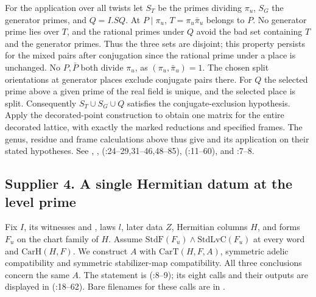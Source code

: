 For the application over all twists let $S_T$ be the primes dividing
$\pi_u$, $S_G$ the generator primes, and $Q=I.SQ$. At $P\mid\pi_u$,
$T=\pi_u\bar\pi_u$ belongs to $P$. No generator prime lies over $T$,
and the rational primes under $Q$ avoid the bad set containing $T$ and
the generator primes. Thus the three sets are disjoint; this property
persists for the mixed pairs after conjugation since the rational prime
under a place is unchanged. No $P,\bar P$ both divide $\pi_u$,
as $(\pi_u,\bar\pi_u)=1$. The chosen split orientations at generator
places exclude conjugate pairs there. For $Q$ the selected prime above
a given prime of the real field is unique, and the selected place is
split. Consequently $S_T\cup S_G\cup Q$ satisfies the conjugate-exclusion
hypothesis. Apply the decorated-point construction to obtain one matrix
for the entire decorated lattice, with exactly the marked reductions and
specified frames. The genus, residue and frame calculations above thus give
 and its application
 on their stated hypotheses. See , , 
(:24--29,31--46,48--85), 
(:11--60), and
:7--8.

\subsection{Supplier 4. A single Hermitian datum at the level prime}
\label{r12:s4}
Fix $I$, its witnesses  and , laws $l$, later data
$Z$, Hermitian columns $H$, and forms $F_u$ on the chart family of $H$.
Assume $\mathrm{StdF}(F_u)\land\mathrm{StdLvC}(F_u)$ at every word
and $\mathrm{CarH}(H,F)$. We construct $A$ with $\mathrm{CarT}(H,F,A)$,
symmetric adelic compatibility and symmetric stabilizer-map compatibility.
All three conclusions concern the same $A$. The statement is
(:8--9); its eight calls
and their outputs are displayed in 
(:18--62). Bare filenames for these calls
are in .

